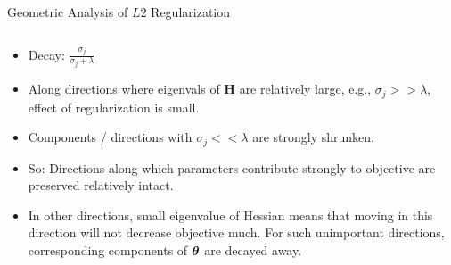 \documentclass[11pt,compress,t,notes=noshow, xcolor=table]{beamer}
\begin{document}
\begin{vbframe}{Geometric Analysis of $L2$ Regularization}

  
  
  
  \begin{columns}
    \begin{column}{0.5\textwidth}
      
      {\scriptsize
      \begin{itemize}\setlength{\itemsep}{1.0em}
          \item  Decay: $\frac{\sigma_j}{\sigma_j + \lambda}$ 
          \item Along directions where eigenvals of $\bm{H}$ are relatively large, e.g.,  $\sigma_j >> \lambda$, effect of regularization is small.
  \item Components / directions with $\sigma_j << \lambda$ are strongly shrunken.
  \item So: Directions along which parameters contribute strongly to objective are preserved relatively intact.
  \item In other directions, small eigenvalue of Hessian means that moving in this direction will not decrease objective much. For such unimportant directions, corresponding components of $\bm{\theta}$ are decayed away.
        \end{itemize}
      }
      \end{column}
    

\end{columns}
\end{vbframe}
\end{document}
